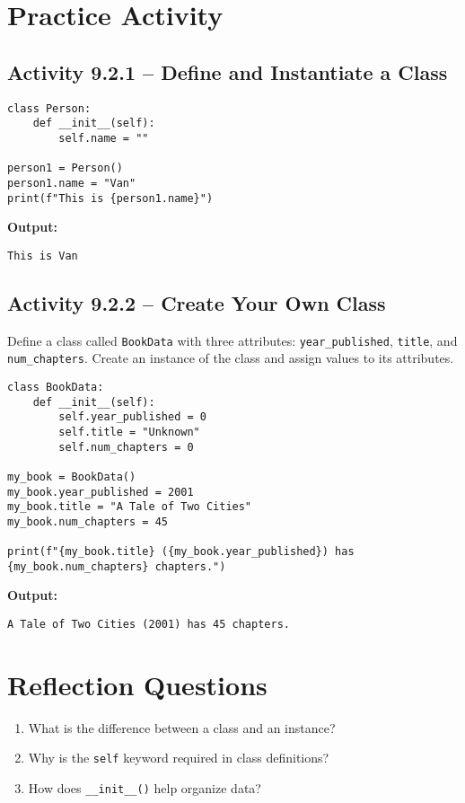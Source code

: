 \section{Practice Activity}

\subsection*{Activity 9.2.1 – Define and Instantiate a Class}

\begin{verbatim}
class Person:
    def __init__(self):
        self.name = ""

person1 = Person()
person1.name = "Van"
print(f"This is {person1.name}")
\end{verbatim}

\textbf{Output:}
\begin{verbatim}
This is Van
\end{verbatim}

\subsection*{Activity 9.2.2 – Create Your Own Class}

Define a class called \texttt{BookData} with three attributes:
\texttt{year\_published}, \texttt{title}, and \texttt{num\_chapters}.
Create an instance of the class and assign values to its attributes.

\begin{verbatim}
class BookData:
    def __init__(self):
        self.year_published = 0
        self.title = "Unknown"
        self.num_chapters = 0

my_book = BookData()
my_book.year_published = 2001
my_book.title = "A Tale of Two Cities"
my_book.num_chapters = 45

print(f"{my_book.title} ({my_book.year_published}) has {my_book.num_chapters} chapters.")
\end{verbatim}

\textbf{Output:}
\begin{verbatim}
A Tale of Two Cities (2001) has 45 chapters.
\end{verbatim}

\section{Reflection Questions}
\begin{enumerate}
    \item What is the difference between a class and an instance?
    \item Why is the \texttt{self} keyword required in class definitions?
    \item How does \texttt{\_\_init\_\_()} help organize data?
\end{enumerate}

